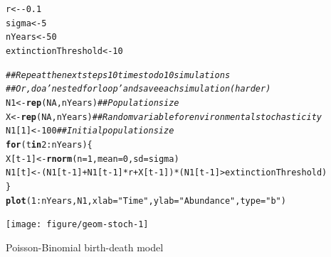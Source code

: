 \documentclass[12pt]{article}\usepackage[]{graphicx}\usepackage[]{color}
\makeatletter
\newcommand{\hlnum}[1]{\textcolor[rgb]{0.686,0.059,0.569}{#1}}%
\newcommand{\hlstr}[1]{\textcolor[rgb]{0.192,0.494,0.8}{#1}}%
\newcommand{\hlcom}[1]{\textcolor[rgb]{0.678,0.584,0.686}{\textit{#1}}}%
\newcommand{\hlopt}[1]{\textcolor[rgb]{0,0,0}{#1}}%
\newcommand{\hlstd}[1]{\textcolor[rgb]{0.345,0.345,0.345}{#1}}%
\newcommand{\hlkwa}[1]{\textcolor[rgb]{0.161,0.373,0.58}{\textbf{#1}}}%
\newcommand{\hlkwb}[1]{\textcolor[rgb]{0.69,0.353,0.396}{#1}}%
\newcommand{\hlkwc}[1]{\textcolor[rgb]{0.333,0.667,0.333}{#1}}%
\newcommand{\hlkwd}[1]{\textcolor[rgb]{0.737,0.353,0.396}{\textbf{#1}}}%
\newenvironment{kframe}{%
 \def\at@end@of@kframe{}%
 \ifinner\ifhmode%
  \def\at@end@of@kframe{\end{minipage}}%
  \begin{minipage}{\columnwidth}%
 \fi\fi%
 \def\FrameCommand##1{\hskip\@totalleftmargin \hskip-\fboxsep
 \colorbox{shadecolor}{##1}\hskip-\fboxsep
     \hskip-\linewidth \hskip-\@totalleftmargin \hskip\columnwidth}%
 \MakeFramed {\advance\hsize-\width
   \@totalleftmargin\z@ \linewidth\hsize
   \@setminipage}}%
 {\par\unskip\endMakeFramed%
 \at@end@of@kframe}
\newenvironment{knitrout}{}{} %
\makeatother
\begin{document}
\begin{knitrout}
\color{fgcolor}\begin{kframe}
\begin{alltt}
\hlstd{r} \hlkwb{<-} \hlopt{-}\hlnum{0.1}
\hlstd{sigma} \hlkwb{<-} \hlnum{5}
\hlstd{nYears} \hlkwb{<-} \hlnum{50}
\hlstd{extinctionThreshold} \hlkwb{<-} \hlnum{10}

\hlcom{## Repeat the next steps 10 times to do 10 simulations}
\hlcom{## Or, do a 'nested for loop' and save each simulation (harder)}
\hlstd{N1} \hlkwb{<-} \hlkwd{rep}\hlstd{(}\hlnum{NA}\hlstd{, nYears)}  \hlcom{## Population size }
\hlstd{X} \hlkwb{<-} \hlkwd{rep}\hlstd{(}\hlnum{NA}\hlstd{, nYears)}   \hlcom{## Random variable for environmental stochasticity}
\hlstd{N1[}\hlnum{1}\hlstd{]} \hlkwb{<-} \hlnum{100}           \hlcom{## Initial population size}
\hlkwa{for}\hlstd{(t} \hlkwa{in} \hlnum{2}\hlopt{:}\hlstd{nYears) \{}
    \hlstd{X[t}\hlopt{-}\hlnum{1}\hlstd{]} \hlkwb{<-} \hlkwd{rnorm}\hlstd{(}\hlkwc{n}\hlstd{=}\hlnum{1}\hlstd{,} \hlkwc{mean}\hlstd{=}\hlnum{0}\hlstd{,} \hlkwc{sd}\hlstd{=sigma)}
    \hlstd{N1[t]} \hlkwb{<-} \hlstd{(N1[t}\hlopt{-}\hlnum{1}\hlstd{]} \hlopt{+} \hlstd{N1[t}\hlopt{-}\hlnum{1}\hlstd{]}\hlopt{*}\hlstd{r} \hlopt{+} \hlstd{X[t}\hlopt{-}\hlnum{1}\hlstd{])}\hlopt{*}\hlstd{(N1[t}\hlopt{-}\hlnum{1}\hlstd{]}\hlopt{>}\hlstd{extinctionThreshold)}
\hlstd{\}}
\hlkwd{plot}\hlstd{(}\hlnum{1}\hlopt{:}\hlstd{nYears, N1,} \hlkwc{xlab}\hlstd{=}\hlstr{"Time"}\hlstd{,} \hlkwc{ylab}\hlstd{=}\hlstr{"Abundance"}\hlstd{,} \hlkwc{type}\hlstd{=}\hlstr{"b"}\hlstd{)}
\end{alltt}
\end{kframe}

{\centering \texttt{[image: figure/geom-stoch-1]} 

}


\end{knitrout}


\newpage

Poisson-Binomial birth-death model
\end{document}
